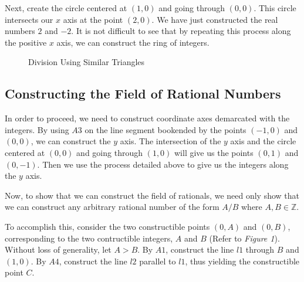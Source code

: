 \documentclass[]{article}
\begin{document}
Next, create the circle centered at $(1,0)$ and going through $(0,0)$. This circle intersects our $x$ axis at the point $(2,0)$. We have just constructed the real numbers $2$ and $-2$. It is not difficult to see that by repeating this process along the positive $x$ axis, we can construct the ring of integers.

   \begin{figure}[h]
   	\centering
   	\caption{Division Using Similar Triangles} \label{figure 1}
   \end{figure}
   
\subsection{Constructing the Field of Rational Numbers} 
 In order to proceed, we need to construct  coordinate axes demarcated with the integers. By using $A3$ on the line segment bookended by the points $(-1,0)$ and $(0,0)$, we can construct the $y$ axis. The intersection of the $y$ axis and the circle centered at $(0,0)$ and going through $(1,0)$ will give us the points $(0,1)$ and $(0,-1)$. Then we use the process detailed above to give us the integers along the $y$ axis.
 
  Now, to show that we can construct the field of rationals, we need only show that we can construct any arbitrary rational number of the form $A/B$ where $A,B \in \mathbb{Z}$.
  
  To accomplish this, consider the two constructible points $(0,A)$ and $(0,B)$, corresponding to the two contructible integers, $A$ and $B$ (Refer to {\em Figure 1}). Without loss of generality, let $A>B$. By $A1$, construct the line $l1$ through $B$ and $(1,0)$. By $A4$, construct the line $l2$ parallel to $l1$, thus yielding the constructible point $C$.
   
\end{document}
